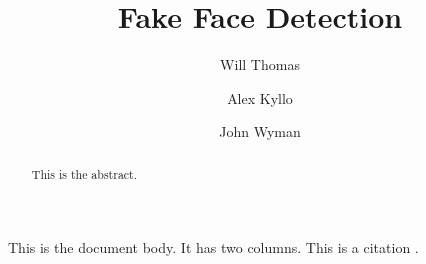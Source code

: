 \documentclass[12pt, letterpaper]{article}
\title{Fake Face Detection}
\author{
  Will Thomas
  \and
  Alex Kyllo
  \and
  John Wyman
}
\begin{document}
\maketitle

\begin{abstract}
  This is the abstract.
\end{abstract}

\begin{multicols}{2}
  This is the document body. It has two columns. This is a citation \cite{karkkainen2019fairface}.
\end{multicols}



\end{document}

